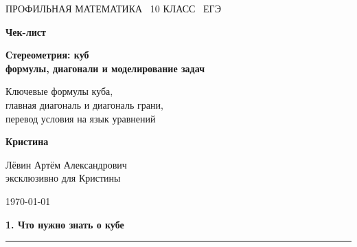 \documentclass[a4paper,12pt]{article}
\newcommand{\sectiontitle}[1]{%
    \vspace{0.6em}
    {\Large\bfseries\color{darkaccent}#1}\par
    \vspace{0.25em}
    {\color{accent}\rule{\linewidth}{0.7pt}}
    \vspace{0.45em}
}
\begin{document}
\begin{titlepage}
\thispagestyle{empty}

\begin{center}

\vspace*{23mm}

{\small\color{softgray}
ПРОФИЛЬНАЯ МАТЕМАТИКА
\textbullet\
10 КЛАСС
\textbullet\
ЕГЭ
}

\vspace{15mm}

{\Huge\bfseries\color{darkaccent}
Чек-лист
}

\vspace{7mm}

{\LARGE\bfseries
Стереометрия: куб\\[2mm]
формулы, диагонали и моделирование задач
}

\vspace{15mm}

{\large
Ключевые формулы куба,\\
главная диагональ и диагональ грани,\\
перевод условия на язык уравнений
}

\vfill

{\large\bfseries
Кристина
}

\vspace{7mm}

{\normalsize
Лёвин Артём Александрович\\
эксклюзивно для Кристины
}

\vspace{5mm}

{\normalsize
\today
}

\vspace{24mm}


\end{center}
\end{titlepage}

\sectiontitle{1. Что нужно знать о кубе}
\end{document}
